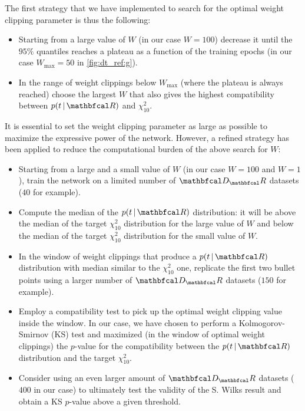 The first strategy that we have implemented to search for the optimal weight clipping parameter is thus the following:

\begin{itemize}
    \item Starting from a large value of $W$ (in our case $W=100$) decrease it until the $95\%$ quantiles reaches a
    plateau as a function of the training epochs (in our case $W_{\text{max}}=50$ in \autoref{fig:dt_ref:g}).
    \item In the range of weight clippings below $W_{\text{max}}$ (where the plateau is always reached) choose the
    largest $W$ that also gives the highest compatibility between $p(t\,|\,\R)$ and $\chi^2_{10}$.
\end{itemize}

It is essential to set the weight clipping parameter as large as possible to maximize the expressive power of the
network. However, a refined strategy has been applied to reduce the computational burden of the above search for $W$: 

\begin{itemize}
    \item Starting from a large and a small value of $W$ (in our case $W=100$ and $W=1$), train the network on a limited
    number of $\D_\R$ datasets ($40$ for example).
    \item Compute the median of the $p(t\,|\,\R)$ distribution: it will be above the median of the target $\chi^2_{10}$
    distribution for the large value of $W$ and below the median of the target $\chi^2_{10}$ distribution for the small
    value of $W$.
    \item In the window of weight clippings that produce a $p(t\,|\,\R)$ distribution with median similar to the
    $\chi^2_{10}$ one, replicate the first two bullet points using a larger number of $\D_\R$ datasets ($150$ for
    example).
    \item Employ a compatibility test to pick up the optimal weight clipping value inside the window. In our case, we
    have chosen to perform a Kolmogorov-Smirnov (KS) test and maximized (in the window of optimal weight clippings) the
    $p$-value for the compatibility between the $p(t\,|\,\R)$ distribution and the target $\chi^2_{10}$.
    \item Consider using an even larger amount of  $\D_\R$ datasets ($400$ in our case) to ultimately test the validity
    of the S. Wilks result and obtain a KS $p$-value above a given threshold.
\end{itemize}

